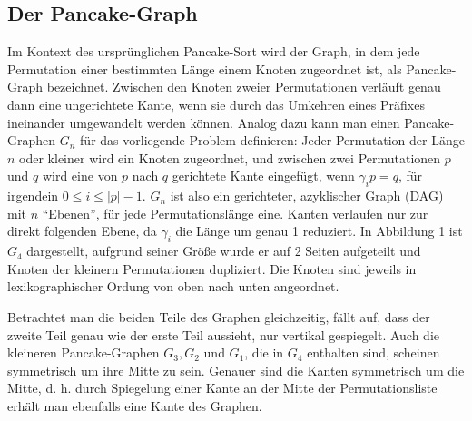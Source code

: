 \documentclass[a4paper, 11pt, ngerman]{article}
\begin{document}
\subsection{Der Pancake-Graph}

Im Kontext des ursprünglichen Pancake-Sort wird der Graph, in dem jede Permutation einer bestimmten Länge einem Knoten zugeordnet ist, als Pancake-Graph bezeichnet. Zwischen den Knoten zweier Permutationen verläuft genau dann eine ungerichtete Kante, wenn sie durch das Umkehren eines Präfixes ineinander umgewandelt werden können. Analog dazu kann man einen Pancake-Graphen $G_n$ für das vorliegende Problem definieren: Jeder Permutation der Länge $n$ oder kleiner wird ein Knoten zugeordnet, und zwischen zwei Permutationen $p$ und $q$ wird eine von $p$ nach $q$ gerichtete Kante eingefügt, wenn $\gamma_i p = q$, für irgendein $0 \le i \le |p|-1$. $G_n$ ist also ein gerichteter, azyklischer Graph (DAG) mit $n$ ``Ebenen'', für jede Permutationslänge eine. Kanten verlaufen nur zur direkt folgenden Ebene, da $\gamma_i$ die Länge um genau 1 reduziert. In Abbildung 1 ist $G_4$ dargestellt, aufgrund seiner Größe wurde er auf 2 Seiten aufgeteilt und Knoten der kleinern Permutationen dupliziert. Die Knoten sind jeweils in lexikographischer Ordung von oben nach unten angeordnet.

Betrachtet man die beiden Teile des Graphen gleichzeitig, fällt auf, dass der zweite Teil genau wie der erste Teil aussieht, nur vertikal gespiegelt. Auch die kleineren Pancake-Graphen $G_3, G_2$ und $G_1$, die in $G_4$ enthalten sind, scheinen symmetrisch um ihre Mitte zu sein. Genauer sind die Kanten symmetrisch um die Mitte, d. h. durch Spiegelung einer Kante an der Mitte der Permutationsliste erhält man ebenfalls eine Kante des Graphen.
\end{document}
